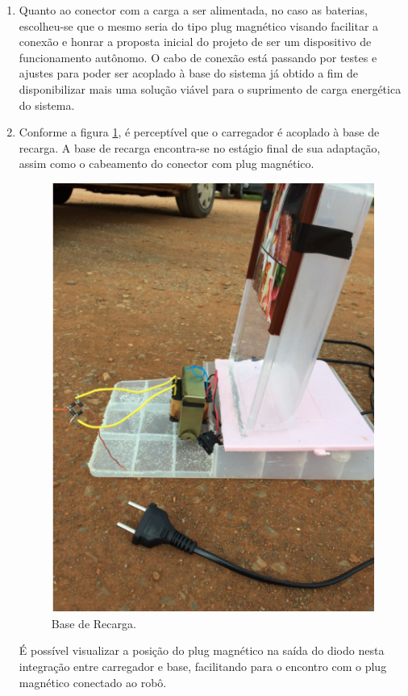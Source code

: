 \begin{itemize}
\begin{enumerate}
			\item Quanto ao conector com a carga a ser alimentada, no caso as baterias, escolheu-se que o mesmo seria do tipo plug magnético visando facilitar a conexão e honrar a proposta inicial do projeto de ser um dispositivo de funcionamento autônomo. O cabo de conexão está passando por testes e ajustes para poder ser acoplado à base do sistema já obtido a fim de disponibilizar mais uma solução viável para o suprimento de carga energética do sistema.

			\item Conforme a figura \ref{img:base_de_recarga}, é perceptível que o carregador é acoplado à base de recarga. A base de recarga encontra-se no estágio final de sua adaptação, assim como o cabeamento do conector com plug magnético.

			\begin{figure}[H]
				\centering
				\includegraphics[scale=0.55]{figuras/basederecarga.png}
				\caption{Base de Recarga.}
				\label{img:base_de_recarga}
			\end{figure}

			É possível visualizar a posição do plug magnético na saída do diodo nesta integração entre carregador e base, facilitando para o encontro com o plug magnético conectado ao robô.


		 \end{enumerate}

	 \end{itemize}


